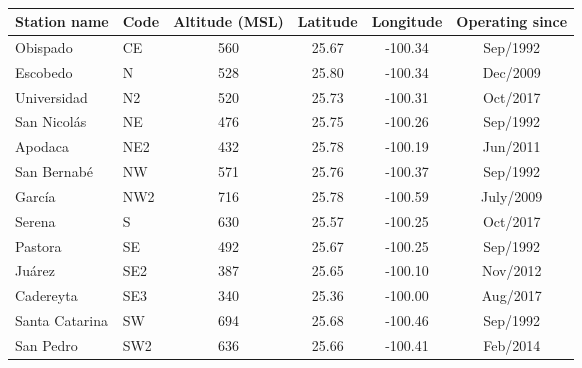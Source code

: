 \begin{table}[H]
    \begin{tabular}{llcccc} \hline
    Station name   & Code       & Altitude (MSL) & Latitude   & Longitude    & Operating since \\ \hline
    Obispado       & CE         & 560              & 25.67 & -100.34 & Sep/1992     \\
    Escobedo       & N          & 528              & 25.80 & -100.34 & Dec/2009     \\
    Universidad    & N2         & 520              & 25.73 & -100.31 & Oct/2017     \\
    San Nicolás    & NE         & 476              & 25.75 & -100.26 & Sep/1992     \\
    Apodaca        & NE2        & 432              & 25.78 & -100.19 & Jun/2011     \\
    San Bernabé    & NW         & 571              & 25.76 & -100.37 & Sep/1992     \\
    García         & NW2        & 716              & 25.78 & -100.59 & July/2009    \\
    Serena         & S          & 630              & 25.57 & -100.25 & Oct/2017     \\
    Pastora        & SE         & 492              & 25.67 & -100.25 & Sep/1992     \\
    Juárez         & SE2        & 387              & 25.65 & -100.10 & Nov/2012     \\
    Cadereyta      & SE3        & 340              & 25.36 & -100.00 & Aug/2017     \\
    Santa Catarina & SW         & 694              & 25.68 & -100.46 & Sep/1992     \\
    San Pedro      & SW2        & 636              & 25.66 & -100.41 & Feb/2014     \\ \hline
    \end{tabular}
\caption{}
\label{table:stations_loc}
\end{table}